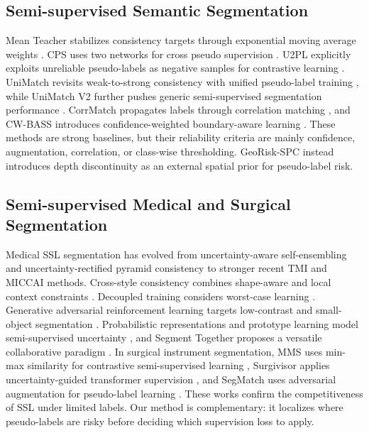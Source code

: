 \documentclass[journal]{IEEEtran}
\begin{document}
\subsection{Semi-supervised Semantic Segmentation}
Mean Teacher stabilizes consistency targets through exponential moving average weights \cite{tarvainen2017mean}. CPS uses two networks for cross pseudo supervision \cite{chen2021cps}. U2PL explicitly exploits unreliable pseudo-labels as negative samples for contrastive learning \cite{wang2022u2pl}. UniMatch revisits weak-to-strong consistency with unified pseudo-label training \cite{yang2023unimatch}, while UniMatch V2 further pushes generic semi-supervised segmentation performance \cite{yang2025unimatchv2}. CorrMatch propagates labels through correlation matching \cite{sun2024corrmatch}, and CW-BASS introduces confidence-weighted boundary-aware learning \cite{cwbass2025}. These methods are strong baselines, but their reliability criteria are mainly confidence, augmentation, correlation, or class-wise thresholding. GeoRisk-SPC instead introduces depth discontinuity as an external spatial prior for pseudo-label risk.

\subsection{Semi-supervised Medical and Surgical Segmentation}
Medical SSL segmentation has evolved from uncertainty-aware self-ensembling \cite{yu2019uncertainty} and uncertainty-rectified pyramid consistency \cite{chen2021urpc,luo2022urpc} to stronger recent TMI and MICCAI methods. Cross-style consistency combines shape-aware and local context constraints \cite{liu2024crossstyle}. Decoupled training considers worst-case learning \cite{das2024decoupled}. Generative adversarial reinforcement learning targets low-contrast and small-object segmentation \cite{xu2024drlssl}. Probabilistic representations and prototype learning model semi-supervised uncertainty \cite{yuan2025probabilistic}, and Segment Together proposes a versatile collaborative paradigm \cite{zeng2025segment}. In surgical instrument segmentation, MMS uses min-max similarity for contrastive semi-supervised learning \cite{li2023minmax}, Surgivisor applies uncertainty-guided transformer supervision \cite{liu2024surgivisor}, and SegMatch uses adversarial augmentation for pseudo-label learning \cite{segmatch2025}. These works confirm the competitiveness of SSL under limited labels. Our method is complementary: it localizes where pseudo-labels are risky before deciding which supervision loss to apply.
\end{document}
